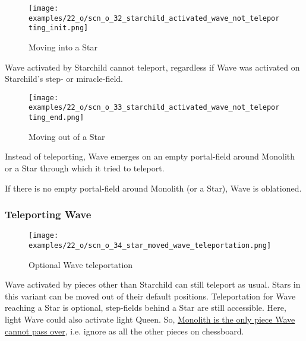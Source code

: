 \vspace*{-0.1\baselineskip}
\noindent
\begin{wrapfigure}[4]{l}{0.4\textwidth}
\centering
\texttt{[image: examples/22\_o/scn\_o\_32\_starchild\_activated\_wave\_not\_teleporting\_init.png]}
\vspace*{-0.4\baselineskip}
\caption{Moving into a Star}
\label{fig:scn_o_32_starchild_activated_wave_not_teleporting_init}
\end{wrapfigure}
Wave activated by Starchild cannot teleport, regardless if Wave was activated on
Starchild's step- or miracle-field.

\vspace*{5.7\baselineskip}
\noindent
\begin{wrapfigure}[7]{l}{0.4\textwidth}
\centering
\texttt{[image: examples/22\_o/scn\_o\_33\_starchild\_activated\_wave\_not\_teleporting\_end.png]}
\vspace*{-0.4\baselineskip}
\caption{Moving out of a Star}
\label{fig:scn_o_33_starchild_activated_wave_not_teleporting_end}
\end{wrapfigure}
Instead of teleporting, Wave emerges on an empty portal-field around Monolith or a
Star through which it tried to teleport.

If there is no empty portal-field around Monolith (or a Star), Wave is oblationed.

\clearpage %

\subsubsection*{Teleporting Wave}
\label{sec:One/Starchild/Activating Wave/Teleporting Wave}

\vspace*{-1.5\baselineskip}
\noindent
\begin{figure}[!h]
\texttt{[image: examples/22\_o/scn\_o\_34\_star\_moved\_wave\_teleportation.png]}
\vspace*{-1.4\baselineskip}
\caption{Optional Wave teleportation}
\label{fig:scn_o_34_star_moved_wave_teleportation}
\end{figure}

\vspace*{-0.5\baselineskip}
Wave activated by pieces other than Starchild can still teleport as usual. Stars
in this variant can be moved out of their default positions. Teleportation for
Wave reaching a Star is optional, step-fields behind a Star are still accessible.
Here, light Wave could also activate light Queen. So,
\hyperref[fig:scn_d_14_teleport_wave_via_monolith]{Monolith is the only piece Wave cannot pass over},
i.e. ignore as all the other pieces on chessboard.

